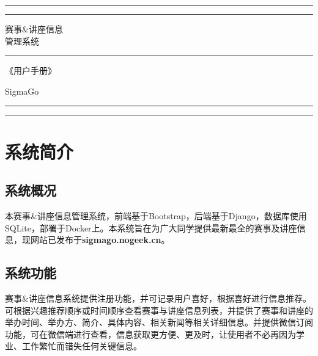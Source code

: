 \documentclass[UTF8]{ctexart}
\date{}
\title{}
\author{}
\begin{document}
\begin{titlepage} 
    \centering     
    \rule{\textwidth}{1pt} 
    \vspace{2pt}\vspace{-\baselineskip} 
    \rule{\textwidth}{0.4pt} 
    \vspace{0.1\textheight} 
    
        {\Huge 赛事\&讲座信息}\\[0.5\baselineskip] 
        {\Huge 管理系统} 
    
    \vspace{0.025\textheight} 
    \rule{0.3\textwidth}{0.4pt} 
    \vspace{0.1\textheight}

        {\huge 《用户手册》} 
    
    \vspace{0.1\textheight}
    
        {\Large SigmaGo}

    \vfill 
    \rule{\textwidth}{0.4pt} 
    \vspace{2pt}\vspace{-\baselineskip} 
    \rule{\textwidth}{1pt}    
\end{titlepage}

\newpage
\tableofcontents


\newpage
\section{系统简介}

\subsection{系统概况}
\vspace{0.05\textheight}

\large
本赛事\&讲座信息管理系统，前端基于Bootstrap，后端基于Django，数据库使用SQLite，部署于Docker上。本系统旨在为广大同学提供最新最全的赛事及讲座信息，现网站已发布于{\bfseries sigmago.nogeek.cn}。

\vspace{0.15\textheight}
\subsection{系统功能}
\vspace{0.05\textheight}

赛事\&讲座信息系统提供注册功能，并可记录用户喜好，根据喜好进行信息推荐。可根据兴趣推荐顺序或时间顺序查看赛事与讲座信息列表，并提供了赛事和讲座的举办时间、举办方、简介、具体内容、相关新闻等相关详细信息。并提供微信订阅功能，可在微信端进行查看，信息获取更方便、更及时，让使用者不必再因为学业、工作繁忙而错失任何关键信息。
\end{document}
